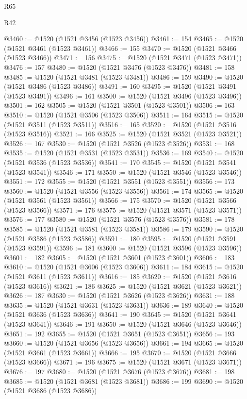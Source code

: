 \begin{lexlean}{R65}
\begin{lexlean}{R42}
\begin{coremodule}
{{{{{{{{{{{{{{{{{{{{{{{{{{{{{{{{{{{{{{{{{{{{{{{{{{{{{{{{{{{{{{{{{{{{{{{{{{{{{{{{{{{{{{{{{{{{{{{{{{{{{{{{{{{{{{{{{{{{{{{{{{{{{{{{{{{{{{{{{{{{{{{{{{{{{{{{{{{{{{{{{{{{{{{{{{{{{{{{{{{{{{{{@3460 := @1520 (@1521 @3456 (@1523 @3456))
@3461 := 154
@3465 := @1520 (@1521 @3461 (@1523 @3461))
@3466 := 155
@3470 := @1520 (@1521 @3466 (@1523 @3466))
@3471 := 156
@3475 := @1520 (@1521 @3471 (@1523 @3471))
@3476 := 157
@3480 := @1520 (@1521 @3476 (@1523 @3476))
@3481 := 158
@3485 := @1520 (@1521 @3481 (@1523 @3481))
@3486 := 159
@3490 := @1520 (@1521 @3486 (@1523 @3486))
@3491 := 160
@3495 := @1520 (@1521 @3491 (@1523 @3491))
@3496 := 161
@3500 := @1520 (@1521 @3496 (@1523 @3496))
@3501 := 162
@3505 := @1520 (@1521 @3501 (@1523 @3501))
@3506 := 163
@3510 := @1520 (@1521 @3506 (@1523 @3506))
@3511 := 164
@3515 := @1520 (@1521 @3511 (@1523 @3511))
@3516 := 165
@3520 := @1520 (@1521 @3516 (@1523 @3516))
@3521 := 166
@3525 := @1520 (@1521 @3521 (@1523 @3521))
@3526 := 167
@3530 := @1520 (@1521 @3526 (@1523 @3526))
@3531 := 168
@3535 := @1520 (@1521 @3531 (@1523 @3531))
@3536 := 169
@3540 := @1520 (@1521 @3536 (@1523 @3536))
@3541 := 170
@3545 := @1520 (@1521 @3541 (@1523 @3541))
@3546 := 171
@3550 := @1520 (@1521 @3546 (@1523 @3546))
@3551 := 172
@3555 := @1520 (@1521 @3551 (@1523 @3551))
@3556 := 173
@3560 := @1520 (@1521 @3556 (@1523 @3556))
@3561 := 174
@3565 := @1520 (@1521 @3561 (@1523 @3561))
@3566 := 175
@3570 := @1520 (@1521 @3566 (@1523 @3566))
@3571 := 176
@3575 := @1520 (@1521 @3571 (@1523 @3571))
@3576 := 177
@3580 := @1520 (@1521 @3576 (@1523 @3576))
@3581 := 178
@3585 := @1520 (@1521 @3581 (@1523 @3581))
@3586 := 179
@3590 := @1520 (@1521 @3586 (@1523 @3586))
@3591 := 180
@3595 := @1520 (@1521 @3591 (@1523 @3591))
@3596 := 181
@3600 := @1520 (@1521 @3596 (@1523 @3596))
@3601 := 182
@3605 := @1520 (@1521 @3601 (@1523 @3601))
@3606 := 183
@3610 := @1520 (@1521 @3606 (@1523 @3606))
@3611 := 184
@3615 := @1520 (@1521 @3611 (@1523 @3611))
@3616 := 185
@3620 := @1520 (@1521 @3616 (@1523 @3616))
@3621 := 186
@3625 := @1520 (@1521 @3621 (@1523 @3621))
@3626 := 187
@3630 := @1520 (@1521 @3626 (@1523 @3626))
@3631 := 188
@3635 := @1520 (@1521 @3631 (@1523 @3631))
@3636 := 189
@3640 := @1520 (@1521 @3636 (@1523 @3636))
@3641 := 190
@3645 := @1520 (@1521 @3641 (@1523 @3641))
@3646 := 191
@3650 := @1520 (@1521 @3646 (@1523 @3646))
@3651 := 192
@3655 := @1520 (@1521 @3651 (@1523 @3651))
@3656 := 193
@3660 := @1520 (@1521 @3656 (@1523 @3656))
@3661 := 194
@3665 := @1520 (@1521 @3661 (@1523 @3661))
@3666 := 195
@3670 := @1520 (@1521 @3666 (@1523 @3666))
@3671 := 196
@3675 := @1520 (@1521 @3671 (@1523 @3671))
@3676 := 197
@3680 := @1520 (@1521 @3676 (@1523 @3676))
@3681 := 198
@3685 := @1520 (@1521 @3681 (@1523 @3681))
@3686 := 199
@3690 := @1520 (@1521 @3686 (@1523 @3686))
}}}}}}}}}}}}}}}}}}}}}}}}}}}}}}}}}}}}}}}}}}}}}}}}}}}}}}}}}}}}}}}}}}}}}}}}}}}}}}}}}}}}}}}}}}}}}}}}}}}}}}}}}}}}}}}}}}}}}}}}}}}}}}}}}}}}}}}}}}}}}}}}}}}}}}}}}}}}}}}}}}}}}}}}}}}}}}}}}}}}}}}}
\end{coremodule}
\end{lexlean}
\end{lexlean}
